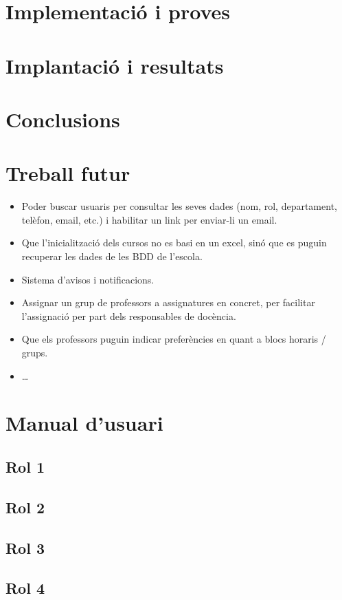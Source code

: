 \documentclass[a4paper,12pt]{ThesisStyle}
\begin{document}
\chapter{Implementació i proves}
\label{cap:implementacio}





\chapter{Implantació i resultats}
\label{cap:implantacio}





\chapter{Conclusions}
\label{cap:conclusions}





\chapter{Treball futur}
\label{cap:treball_futur}

\begin{itemize}
  \item Poder buscar usuaris per consultar les seves dades (nom, rol, departament, telèfon, email, etc.) i habilitar un link per enviar-li un email.
  \item Que l'inicialització dels cursos no es basi en un excel, sinó que es puguin recuperar les dades de les BDD de l'escola.
  \item Sistema d'avisos i notificacions.
  \item Assignar un grup de professors a assignatures en concret, per facilitar l'assignació per part dels responsables de docència.
  \item Que els professors puguin indicar preferències en quant a blocs horaris / grups.
  \item \ldots
\end{itemize}


\backmatter





%

\chapter*{Manual d'usuari}

\section*{Rol 1}



\section*{Rol 2}



\section*{Rol 3}



\section*{Rol 4}
\end{document}
